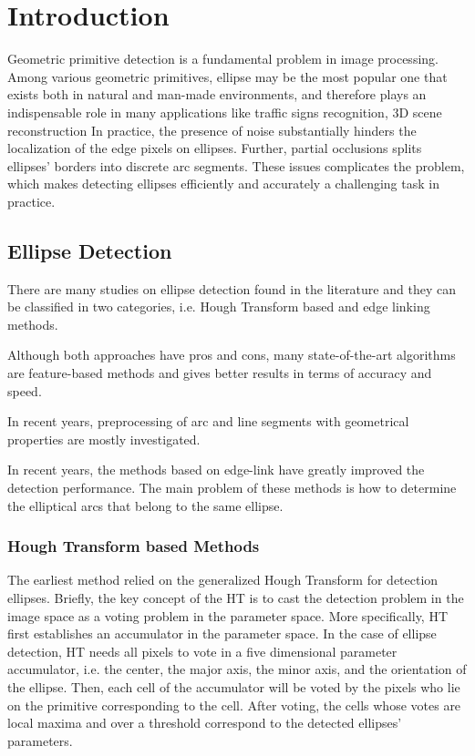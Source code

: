 \documentclass[a4paper]{report}
\begin{document}
\section{Introduction}
Geometric primitive detection is a fundamental problem in image processing. Among various geometric primitives, ellipse may be the most popular one that exists both in natural and man-made environments, and therefore plays an indispensable role in many applications like traffic signs recognition, 3D scene reconstruction
In practice, the presence of noise substantially hinders the localization of the edge pixels on ellipses. Further, partial occlusions splits ellipses' borders into discrete arc segments. These issues complicates the problem, which makes detecting ellipses efficiently and accurately a challenging task in practice. 
\subsection{Ellipse Detection}
There are many studies on ellipse detection found in the literature and they can be classified in two categories, i.e. Hough Transform based and edge linking methods.

Although both approaches have pros and cons, many state-of-the-art algorithms
are feature-based methods and gives better results in terms of accuracy and
speed.

In recent years, preprocessing of arc and line segments with geometrical properties are mostly investigated.

In recent years, the methods based on edge-link have greatly
improved the detection performance. The main problem of
these methods is how to determine the elliptical arcs that
belong to the same ellipse.

\subsubsection{Hough Transform based Methods}
The earliest method relied on the generalized Hough Transform for detection ellipses. Briefly,
the key concept of the HT is to cast the detection problem in the image space as a voting problem in the parameter space. More specifically, HT first establishes an accumulator in the parameter space. In the case of ellipse detection, HT needs all pixels to vote in a five dimensional parameter accumulator, i.e. the center, the major axis, the minor axis, and the orientation of the ellipse. Then, each cell of the accumulator will be voted by the pixels who lie on the primitive corresponding to the cell. 
After voting, the cells whose votes are local maxima and over a threshold correspond to the detected ellipses' parameters.
\end{document}
